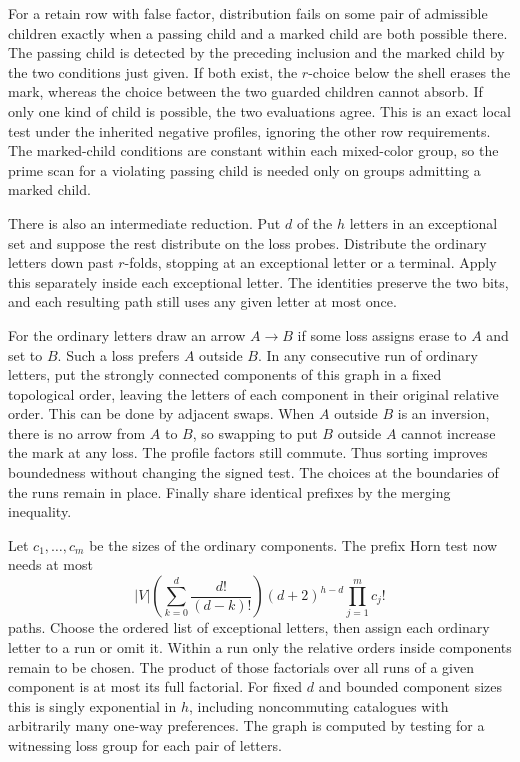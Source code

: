 For a retain row with false factor, distribution
fails on some pair of admissible children exactly
when a passing child and a marked child are both
possible there. The passing child is detected by the
preceding inclusion and the marked child by the two
conditions just given. If both exist, the $r$-choice
below the shell erases the mark, whereas the choice
between the two guarded children cannot absorb.
If only one kind of child is possible, the two
evaluations agree. This is an exact local test under
the inherited negative profiles, ignoring the
other row requirements. The marked-child conditions
are constant within each mixed-color group, so the
prime scan for a violating passing child is needed
only on groups admitting a marked child.

There is also an intermediate reduction. Put $d$ of the
$h$ letters in an exceptional set and suppose the rest
distribute on the loss probes. Distribute the ordinary
letters down past $r$-folds, stopping at an exceptional
letter or a terminal. Apply this separately inside each
exceptional letter. The identities preserve the two
bits, and each resulting path still uses any given
letter at most once.

For the ordinary letters draw an arrow $A\to B$ if
some loss assigns erase to $A$ and set to $B$. Such a
loss prefers $A$ outside $B$. In any consecutive run
of ordinary letters, put the strongly connected
components of this graph in a fixed topological order,
leaving the letters of each component in their original
relative order. This can be done by adjacent swaps.
When $A$ outside $B$ is an inversion, there is no
arrow from $A$ to $B$, so swapping to put $B$ outside
$A$ cannot increase the mark at any loss. The
profile factors still commute. Thus sorting improves
boundedness without changing the signed test.
The choices at the boundaries of the runs remain
in place. Finally share identical prefixes by the
merging inequality.

Let $c_1,\ldots,c_m$ be the sizes of the ordinary
components. The prefix Horn test now needs at most
\[
 |V|\left(\sum_{k=0}^d\frac{d!}{(d-k)!}\right)
       (d+2)^{h-d}\prod_{j=1}^m c_j!
\]
paths. Choose the ordered list of exceptional letters,
then assign each ordinary letter to a run or omit it.
Within a run only the relative orders inside components
remain to be chosen. The product of those factorials
over all runs of a given component is at most its
full factorial. For fixed $d$ and bounded component
sizes this is singly exponential in $h$, including
noncommuting catalogues with arbitrarily many one-way
preferences. The graph is computed by testing for
a witnessing loss group for each pair of letters.

